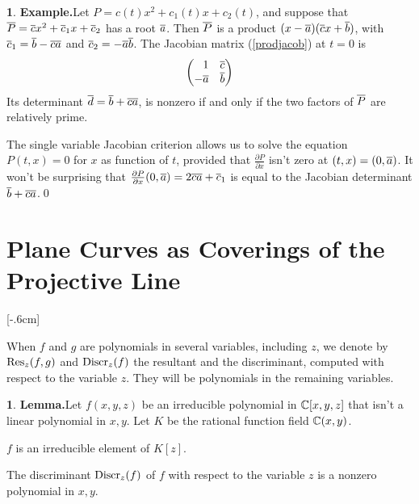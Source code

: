 \documentclass[leqno]{book}
\newcommand\Marginnote[1]{\marginnote{\hspace{-12pt}\normalfont{#1}}}
\theoremstyle{definition}%
\numberwithin{equation}{section}
\newtheorem{example}[equation]{}
\theoremstyle{theorem} %
\newtheorem{lemma}[equation]{}
\begin{document}
\begin{example}{\bf Example.}\label{henselex}
Let $P = c(t)x^2+c_1(t)x+c_2(t)$, and suppose that $\overline P = \overline c
x^2+\overline c_1x+\overline c_2$ has a root $\overline a$.  Then $\overline P$ is a product
$(x-\overline a)(\overline c x+\overline b)$, with $\overline c_1 = \overline b - \overline c\overline a$ and $\overline c_2=-\overline a\overline b$.
The Jacobian matrix (\ref{prodjacob}) at $t=0$ is
$$\begin{pmatrix}
\phantom{-}1 & \overline c\\
-\overline a & \overline b
\end{pmatrix}
$$ Its determinant $\overline d = \overline b +\overline c\overline a$, is nonzero if and only if the
two factors of $\overline P$ are relatively prime.

The single variable Jacobian criterion allows us to solve the equation
$P(t,x) =0$ for $x$ as function of $t$, provided that $\frac{\partial
  P}{\partial x}$ isn't zero at $(t,x) = (0,\overline a)$.  It won't be
surprising that $\frac{\partial P}{\partial x}(0,\overline a) = 2\overline c\overline a +
\overline c_1$ is equal to the Jacobian determinant
$\overline b+\overline c\overline a$.\qed\end{example}







\section{Plane Curves as Coverings of the Projective Line}
\label{coverline}\Marginnote{coverline}[-.6cm]

When $f$ and $g$ are polynomials in several variables, including $z$,
we denote by $\operatorname{Res}_z(f,g)$ and $\operatorname{Discr}_z(f)$ the resultant and the
discriminant, computed with respect to the variable $z$.  They will be
polynomials in the remaining variables.

\begin{lemma}{\bf Lemma.}\Marginnote{firroverK}\label{firroverK}
Let $f(x,y,z)$ be an irreducible polynomial in $\mathbb{C}[x,y,z]$ that
isn't a linear polynomial in $x,y$.  Let $K$ be the rational function
field $\mathbb{C}(x,y)$.

  $f$ is an irreducible element of $K[z]$.

 The discriminant $\operatorname{Discr}_z(f)$ of $f$ with respect to
the variable $z$ is a nonzero polynomial in $x,y$.
\end{lemma}
\end{document}
